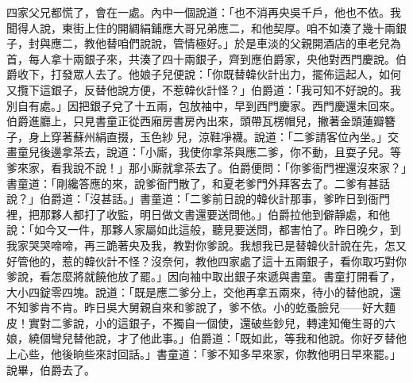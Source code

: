 四家父兄都慌了，會在一處。內中一個說道：「也不消再央吳千戶，他也不依。我聞得人說，東街上住的開綢絹鋪應大哥兄弟應二，和他契厚。咱不如湊了幾十兩銀子，封與應二，教他替咱們說說，管情極好。」於是車淡的父親開酒店的車老兒為首，每人拿十兩銀子來，共湊了四十兩銀子，齊到應伯爵家，央他對西門慶說。伯爵收下，打發眾人去了。他娘子兒便說：「你既替韓伙計出力，擺佈這起人，如何又攬下這銀子，反替他說方便，不惹韓伙計怪？」伯爵道：「我可知不好說的。我別自有處。」因把銀子兌了十五兩，包放袖中，早到西門慶家。西門慶還未回來。伯爵進廳上，只見書童正從西廂房書房內出來，頭帶瓦楞帽兒，撇著金頭蓮瓣簪子，身上穿著蘇州絹直掇，玉色紗𧜽兒，涼鞋凈襪。說道：「二爹請客位內坐。」交畫童兒後邊拿茶去，說道：「小廝，我使你拿茶與應二爹，你不動，且耍子兒。等爹來家，看我說不說！」那小廝就拿茶去了。伯爵便問：「你爹衙門裡還沒來家？」書童道：「剛纔答應的來，說爹衙門散了，和夏老爹門外拜客去了。二爹有甚話說？」伯爵道：「沒甚話。」書童道：「二爹前日說的韓伙計那事，爹昨日到衙門裡，把那夥人都打了收監，明日做文書還要送問他。」伯爵拉他到僻靜處，和他說：「如今又一件，那夥人家屬如此這般，聽見要送問，都害怕了。昨日晚夕，到我家哭哭啼啼，再三跪著央及我，教對你爹說。我想我已是替韓伙計說在先，怎又好管他的，惹的韓伙計不怪？沒奈何，教他四家處了這十五兩銀子，看你取巧對你爹說，看怎麼將就饒他放了罷。」因向袖中取出銀子來遞與書童。書童打開看了，大小四錠零四塊。說道：「既是應二爹分上，交他再拿五兩來，待小的替他說，還不知爹肯不肯。昨日吳大舅親自來和爹說了，爹不依。小的虼蚤臉兒——好大麵皮！實對二爹說，小的這銀子，不獨自一個使，還破些鈔兒，轉達知俺生哥的六娘，繞個彎兒替他說，才了他此事。」伯爵道：「既如此，等我和他說。你好歹替他上心些，他後晌些來討回話。」書童道：「爹不知多早來家，你教他明日早來罷。」說畢，伯爵去了。

